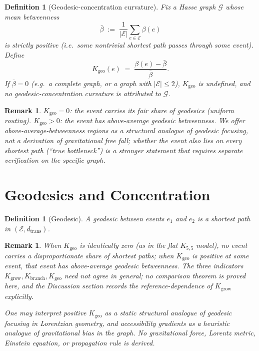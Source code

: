 \documentclass[12pt]{article}
\newtheorem{definition}[theorem]{Definition}
\newtheorem{remark}[theorem]{Remark}
\newcommand{\Ecal}{\mathcal{E}}
\newcommand{\Gcal}{\mathcal{G}}
\begin{document}
\begin{definition}[Geodesic-concentration curvature]\label{def:Kgeo}
Fix a Hasse graph $\Gcal$ whose mean betweenness
\[
    \bar{\beta} \;:=\; \frac{1}{|\Ecal|}\sum_{e \in \Ecal} \beta(e)
\]
is strictly positive (i.e.\ some nontrivial shortest path passes through some event). Define
\begin{equation}\label{eq:Kgeo}
    K_{\mathrm{geo}}(e) \;=\; \frac{\beta(e) - \bar{\beta}}{\bar{\beta}}.
\end{equation}
If $\bar\beta = 0$ (e.g.\ a complete graph, or a graph with $|\Ecal| \leq 2$), $K_{\mathrm{geo}}$ is undefined, and no geodesic-concentration curvature is attributed to $\Gcal$.
\end{definition}

\begin{remark}
$K_{\mathrm{geo}} = 0$: the event carries its fair share of geodesics (uniform routing). $K_{\mathrm{geo}} > 0$: the event has above-average geodesic betweenness. We offer above-average-betweenness regions as a structural analogue of geodesic focusing, not a derivation of gravitational free fall; whether the event also lies on every shortest path (``true bottleneck'') is a stronger statement that requires separate verification on the specific graph.
\end{remark}

\section{Geodesics and Concentration}\label{sec:geodesic}

\begin{definition}[Geodesic]\label{def:geodesic}
A \textit{geodesic} between events $e_1$ and $e_2$ is a shortest path in $(\Ecal, d_{\mathrm{trans}})$.
\end{definition}

\begin{remark}
When $K_{\mathrm{geo}}$ is identically zero (as in the flat $K_{5,5}$ model), no event carries a disproportionate share of shortest paths; when $K_{\mathrm{geo}}$ is positive at some event, that event has above-average geodesic betweenness. The three indicators $K_{\mathrm{grow}}, K_{\mathrm{branch}}, K_{\mathrm{geo}}$ need not agree in general; no comparison theorem is proved here, and the Discussion section records the reference-dependence of $K_{\mathrm{grow}}$ explicitly.

One may interpret positive $K_{\mathrm{geo}}$ as a static structural analogue of geodesic focusing in Lorentzian geometry, and accessibility gradients as a heuristic analogue of gravitational bias in the graph. No gravitational force, Lorentz metric, Einstein equation, or propagation rule is derived.
\end{remark}
\end{document}
